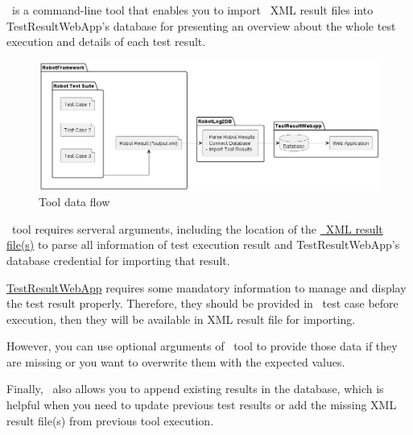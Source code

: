 



\pkg\ is a command-line tool that enables you to import \rfwcore\ XML result 
files into TestResultWebApp's database for presenting an overview about the 
whole test execution and details of each test result.

\begin{figure}[h!]
   \includegraphics[width=1\linewidth]{./pictures/data_flow.png}
   \caption{Tool data flow}
\end{figure}

\pkg\ tool requires serveral arguments, including the location of the
\href{https://robotframework.org/robotframework/latest/RobotFrameworkUserGuide.html#output-file}
{\rfwcore\ XML result file(s)} to parse all information of test execution result 
and TestResultWebApp's database credential for importing that result.

\href{https://github.com/test-fullautomation/testresultwebapp}{TestResultWebApp} 
requires some mandatory information to manage and display the test result properly. 
Therefore, they should be provided in \rfwcore\ test case before execution, then 
they will be available in XML result file for importing.

However, you can use optional arguments of \pkg\ tool to provide those data 
if they are missing or you want to overwrite them with the expected values.

Finally, \pkg\ also allows you to append existing results in the database, which 
is helpful when you need to update previous test results or add the missing 
XML result file(s) from previous tool execution.
